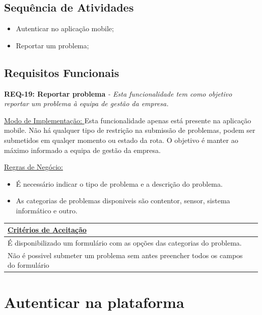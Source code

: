 \documentclass{scrreprt}
\begin{document}
	\subsection{Sequência de Atividades}
	
	\begin{itemize}
		\item Autenticar no aplicação mobile;
		\item Reportar um problema;
	\end{itemize}
	
	\subsection{Requisitos Funcionais}
	\textbf{REQ-19: Reportar problema}\newline\newline
	    \textit{- Esta funcionalidade tem como objetivo reportar um problema à equipa de gestão da empresa. }\newline
	    
	 \underline{Modo de Implementação: }Esta funcionalidade apenas está presente na aplicação mobile. Não há qualquer tipo de restrição na submissão de problemas, podem ser submetidos em qualqer momento ou estado da rota. O objetivo é manter ao máximo informado a equipa de gestão da empresa. \newline
	
	\underline{Regras de Negócio: }
		\begin{itemize}
		\item É necessário indicar o tipo de problema e a descrição do problema.
		\item As categorias de problemas disponiveis são contentor, sensor, sistema informático e outro.
	\end{itemize}
	
	\begin{tabular}{|p{5.8in}|p{0.7in}|} \hline 
	\underline{Critérios de Aceitação} \\ \hline 
	É disponibilizado um formulário com as opções das categorias do problema. \\ \hline
	Não é possivel submeter um problema sem antes preencher todos os campos do formulário\\ \hline
	\end{tabular}\newline\newline
	
	\section{Autenticar na plataforma}
	
\end{document}
